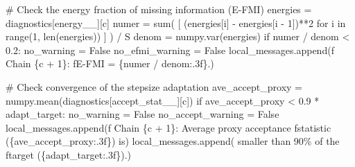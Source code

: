 \documentclass[
  letterpaper,
  DIV=11,
  numbers=noendperiod]{scrartcl}
\newenvironment{Shaded}{\begin{snugshade}}{\end{snugshade}}
\newcommand{\BuiltInTok}[1]{\textcolor[rgb]{0.00,0.23,0.31}{#1}}
\newcommand{\CommentTok}[1]{\textcolor[rgb]{0.37,0.37,0.37}{#1}}
\newcommand{\ControlFlowTok}[1]{\textcolor[rgb]{0.00,0.23,0.31}{#1}}
\newcommand{\DecValTok}[1]{\textcolor[rgb]{0.68,0.00,0.00}{#1}}
\newcommand{\FloatTok}[1]{\textcolor[rgb]{0.68,0.00,0.00}{#1}}
\newcommand{\KeywordTok}[1]{\textcolor[rgb]{0.00,0.23,0.31}{#1}}
\newcommand{\NormalTok}[1]{\textcolor[rgb]{0.00,0.23,0.31}{#1}}
\newcommand{\OperatorTok}[1]{\textcolor[rgb]{0.37,0.37,0.37}{#1}}
\newcommand{\SpecialCharTok}[1]{\textcolor[rgb]{0.37,0.37,0.37}{#1}}
\newcommand{\SpecialStringTok}[1]{\textcolor[rgb]{0.13,0.47,0.30}{#1}}
\newcommand{\StringTok}[1]{\textcolor[rgb]{0.13,0.47,0.30}{#1}}
\newcommand{\VariableTok}[1]{\textcolor[rgb]{0.07,0.07,0.07}{#1}}
\begin{document}
\begin{Shaded}
\begin{Highlighting}[]
    \CommentTok{\# Check the energy fraction of missing information (E{-}FMI)}
\NormalTok{    energies }\OperatorTok{=}\NormalTok{ diagnostics[}\StringTok{\textquotesingle{}energy\_\_\textquotesingle{}}\NormalTok{][c]}
\NormalTok{    numer }\OperatorTok{=} \BuiltInTok{sum}\NormalTok{( [ (energies[i] }\OperatorTok{{-}}\NormalTok{ energies[i }\OperatorTok{{-}} \DecValTok{1}\NormalTok{])}\OperatorTok{**}\DecValTok{2} 
                   \ControlFlowTok{for}\NormalTok{ i }\KeywordTok{in} \BuiltInTok{range}\NormalTok{(}\DecValTok{1}\NormalTok{, }\BuiltInTok{len}\NormalTok{(energies)) ] ) }\OperatorTok{/}\NormalTok{ S}
\NormalTok{    denom }\OperatorTok{=}\NormalTok{ numpy.var(energies)}
    \ControlFlowTok{if}\NormalTok{ numer }\OperatorTok{/}\NormalTok{ denom }\OperatorTok{\textless{}} \FloatTok{0.2}\NormalTok{:}
\NormalTok{      no\_warning }\OperatorTok{=} \VariableTok{False}
\NormalTok{      no\_efmi\_warning }\OperatorTok{=} \VariableTok{False}
\NormalTok{      local\_messages.append(}\SpecialStringTok{f\textquotesingle{}  Chain }\SpecialCharTok{\{}\NormalTok{c }\OperatorTok{+} \DecValTok{1}\SpecialCharTok{\}}\SpecialStringTok{: \textquotesingle{}}
                            \SpecialStringTok{f\textquotesingle{}E{-}FMI = }\SpecialCharTok{\{}\NormalTok{numer }\OperatorTok{/}\NormalTok{ denom}\SpecialCharTok{:.3f\}}\SpecialStringTok{.\textquotesingle{}}\NormalTok{)}
    
    \CommentTok{\# Check convergence of the stepsize adaptation}
\NormalTok{    ave\_accept\_proxy }\OperatorTok{=}\NormalTok{ numpy.mean(diagnostics[}\StringTok{\textquotesingle{}accept\_stat\_\_\textquotesingle{}}\NormalTok{][c])}
    \ControlFlowTok{if}\NormalTok{ ave\_accept\_proxy }\OperatorTok{\textless{}} \FloatTok{0.9} \OperatorTok{*}\NormalTok{ adapt\_target:}
\NormalTok{      no\_warning }\OperatorTok{=} \VariableTok{False}
\NormalTok{      no\_accept\_warning }\OperatorTok{=} \VariableTok{False}
\NormalTok{      local\_messages.append(}\SpecialStringTok{f\textquotesingle{}  Chain }\SpecialCharTok{\{}\NormalTok{c }\OperatorTok{+} \DecValTok{1}\SpecialCharTok{\}}\SpecialStringTok{: Average proxy acceptance \textquotesingle{}}
                            \SpecialStringTok{f\textquotesingle{}statistic (}\SpecialCharTok{\{}\NormalTok{ave\_accept\_proxy}\SpecialCharTok{:.3f\}}\SpecialStringTok{) is\textquotesingle{}}\NormalTok{)}
\NormalTok{      local\_messages.append(}\StringTok{\textquotesingle{}                  smaller than 90}\SpecialCharTok{\% o}\StringTok{f the \textquotesingle{}}
                            \SpecialStringTok{f\textquotesingle{}target (}\SpecialCharTok{\{}\NormalTok{adapt\_target}\SpecialCharTok{:.3f\}}\SpecialStringTok{).\textquotesingle{}}\NormalTok{)}
    

\end{Highlighting}
\end{Shaded}
\end{document}
